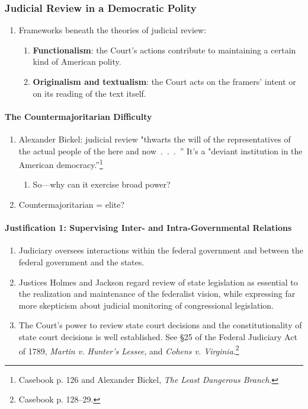 \begin{enumerate}
\subsubsection{Judicial Review in a Democratic Polity}

\begin{enumerate}
    \item Frameworks beneath the theories of judicial review:
    \begin{enumerate}
        \item \textbf{Functionalism}: the Court's actions contribute to 
        maintaining a certain kind of American polity.
        \item \textbf{Originalism and textualism}: the Court acts on the framers' 
        intent or on its reading of the text itself.
    \end{enumerate}
\end{enumerate}

\paragraph{The Countermajoritarian Difficulty}

\begin{enumerate}
    \item Alexander Bickel: judicial review "thwarts the will of the 
    representatives of the actual people of the here and now~.~.~.~'' It's a 
    "deviant institution in the American democracy.''\footnote{Casebook p. 
    126 and Alexander Bickel, \emph{The Least Dangerous Branch}.}
    \begin{enumerate}
        \item So---why can it exercise broad power?
    \end{enumerate}
    \item Countermajoritarian = elite?
\end{enumerate}

\paragraph{Justification 1: Supervising Inter- and Intra-Governmental 
Relations}

\begin{enumerate}
    \item Judiciary oversees interactions within the federal government and 
    between the federal government and the states.
    \item Justices Holmes and Jackson regard review of state legislation as essential to the realization and maintenance of the federalist vision, while expressing far more skepticism about judicial monitoring of congressional legislation.
    \item The Court's power to review state court decisions and the 
    constitutionality of state court decisions is well established. See \S 25 
    of the Federal Judiciary Act of 1789, \emph{Martin v. Hunter's Lessee}, 
    and \emph{Cohens v. Virginia}.\footnote{Casebook p. 128--29.}
\end{enumerate}


\end{enumerate}
